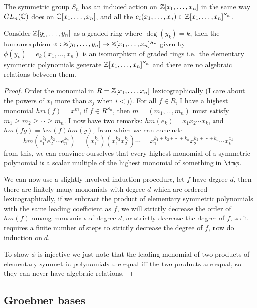 \documentclass{article}
\begin{document}
The symmetric group $S_n$ has an induced action on $\mathbb{Z}[x_1,\ldots, x_n]$ in the same way $GL_n(\mathbb{C})$ does on $\mathbb{C}[x_1,\ldots,x_n]$, and all the $e_i(x_1,\ldots,x_n)\in \mathbb{Z}[x_1,\ldots,x_n]^{S_n}$.

\begin{theorem}
    Consider $\mathbb{Z}[y_1,\ldots,y_n]$ as a graded ring where $\deg(y_k) = k$, then the homomorphism $\phi:\mathbb{Z}[y_1,\ldots,y_n]\rightarrow \mathbb{Z}[x_1,\ldots,x_n]^{S_n}$ given by $\phi(y_k) = e_k(x_1,\ldots, x_n)$ is an isomorphism of graded rings i.e.~the elementary symmetric polynomials generate $\mathbb{Z}[x_1,\ldots,x_n]^{S_n}$ and there are no algebraic relations between them.
    \begin{proof}
        Order the monomial in $R = \mathbb{Z}[x_1,\ldots,x_n]$ lexicographically (I care about the powers of $x_i$ more than $x_j$ when $i<j$). For all $f\in R$, I have a highest monomial $hm(f) = x^m$, if $f\in R^{S_n}$, then $m=(m_1,\ldots,m_n)$ must satisfy $m_1\geq m_2\geq \cdots \geq m_n$. I now have two remarks: $hm(e_k) = x_1x_2\cdots x_k$, and $hm(fg) = hm(f)hm(g)$, from which we can conclude \[
        hm(e_1^{k_1}e_2^{k_2}\cdots e_n^{k_n}) = (x_1^{k_1})(x_1^{k_2}x_2^{k_2})\cdots = x_1^{k_1+k_2+\cdots+k_n}x_2^{k_2+\cdots+k_n}\cdots x_k^{x_k}
        \] from this, we can convince ourselves that every highest monomial of a symmetric polynomial is a scalar multiple of the highest monomial of something in $\im\phi$.

        We can now use a slightly involved induction procedure, let $f$ have degree $d$, then there are finitely many monomials with degree $d$ which are ordered lexicographically, if we subtract the product of elementary symmetric polynomials with the same leading coefficient as $f$, we will strictly decrease the order of $hm(f)$ among monomials of degree $d$, or strictly decrease the degree of $f$, so it requires a finite number of steps to strictly decrease the degree of $f$, now do induction on $d$.

        To show $\phi$ is injective we just note that the leading monomial of two products of elementary symmetric polynomials are equal iff the two products are equal, so they can never have algebraic relations.
    \end{proof}
\end{theorem}

\subsection{Groebner bases}
\end{document}
